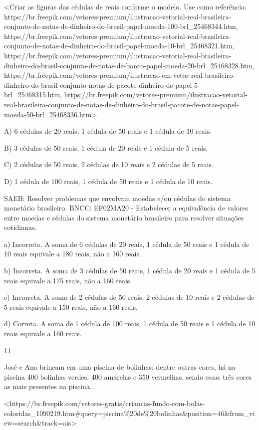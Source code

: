\begin{escolha}
\begin{escolha}
{{{{{{{{\textless{}Criar as figuras das cédulas de reais conforme o modelo. Use
como referência:
https://br.freepik.com/vetores-premium/ilustracao-vetorial-real-brasileira-conjunto-de-notas-de-dinheiro-do-brasil-papel-moeda-100-brl\_25468344.htm,
https://br.freepik.com/vetores-premium/ilustracao-vetorial-real-brasileira-conjunto-de-notas-de-dinheiro-do-brasil-papel-moeda-10-brl\_25468321.htm,
https://br.freepik.com/vetores-premium/ilustracao-vetorial-real-brasileira-dinheiro-do-brasil-conjunto-de-notas-de-banco-papel-moeda-20-brl\_25468328.htm,
https://br.freepik.com/vetores-premium/ilustracao-em-vetor-real-brasileiro-dinheiro-do-brasil-conjunto-notas-de-pacote-dinheiro-de-papel-5-brl\_25468315.htm,
\url{https://br.freepik.com/vetores-premium/ilustracao-vetorial-real-brasileira-conjunto-de-notas-de-dinheiro-do-brasil-pacote-de-notas-papel-moeda-50-brl_25468336.htm}\textgreater{}

A) 6 cédulas de 20 reais, 1 cédula de 50 reais e 1 cédula de 10 reais.

B) 3 cédulas de 50 reais, 1 cédula de 20 reais e 1 cédula de 5 reais.

C) 2 cédulas de 50 reais, 2 cédulas de 10 reais e 2 cédulas de 5 reais.

D) 1 cédula de 100 reais, 1 cédula de 50 reais e 1 cédula de 10 reais.

SAEB: Resolver problemas que envolvam moedas e/ou cédulas do
sistema monetário brasileiro. BNCC: EF02MA20 - Estabelecer a
equivalência de valores entre moedas e cédulas do sistema monetário
brasileiro para resolver situações cotidianas.

a) Incorreta. A soma de 6 cédulas de 20 reais, 1 cédula de 50 reais e 1
cédula de 10 reais equivale a 180 reais, não a 160 reais.

b) Incorreta. A soma de 3 cédulas de 50 reais, 1 cédula de 20 reais e 1
cédula de 5 reais equivale a 175 reais, não a 160 reais.

c) Incorreta. A soma de 2 cédulas de 50 reais, 2 cédulas de 10 reais e 2
cédulas de 5 reais equivale a 150 reais, não a 160 reais.

d) Correta. A soma de 1 cédula de 100 reais, 1 cédula de 50 reais e 1
cédula de 10 reais equivale a 160 reais.

\num{11}

José e Ana brincam em uma piscina de bolinhas; dentre outras cores, há
na piscina 400 bolinhas verdes, 400 amarelas e 350 vermelhas, sendo
essas três cores as mais presentes na piscina.

\textless{}https://br.freepik.com/vetores-gratis/criancas-fundo-com-bolas-coloridas\_1090219.htm\#query=piscina\%20de\%20bolinhas\&position=46\&from\_view=search\&track=ais\textgreater{}

}}}}}}}}
\end{escolha}
\end{escolha}
